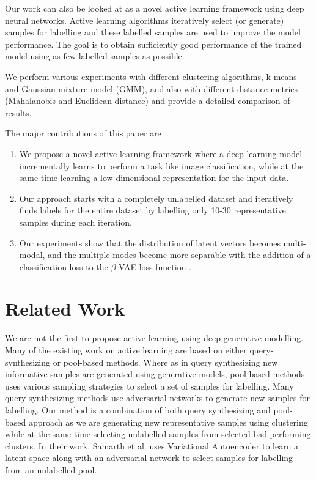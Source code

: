 \documentclass[runningheads]{llncs}
\begin{document}
Our work can also be looked at  as a novel  active learning framework using deep neural networks.
Active learning algorithms iteratively select (or generate) samples for labelling and these labelled samples are used to improve the model performance.
The goal is to obtain sufficiently good performance of the trained model using as few labelled samples as possible.

We perform various experiments with different clustering algorithms,  k-means and Gaussian mixture model (GMM), and also with different distance metrics (Mahalanobis and Euclidean distance) and provide a detailed comparison of results.

The major contributions of this paper are
\begin{enumerate}
    \item We propose a novel active learning framework where a  deep learning model incrementally learns to perform a task like image classification, while at the same time learning a low dimensional representation for the input data.
    \item Our approach starts with a completely unlabelled dataset and iteratively finds labels for the entire dataset by labelling only 10-30 representative samples during each iteration.
    \item Our experiments show that the distribution of latent vectors becomes multi-modal, and the multiple modes become more separable with the addition of a classification loss to the $\beta$-VAE loss function \cite{beta_vae}.
\end{enumerate}

\section{Related Work}
We are not the first to propose active learning using deep generative modelling.
Many of the existing work on active learning are based on either query-synthesizing or  pool-based methods.
Where as in query synthesizing new informative samples are generated using generative models, pool-based methods \cite{wang_2016,beluch_2018} uses various sampling strategies to select a set of samples for labelling.
Many query-synthesizing methods use adversarial networks \cite{mahapatra_2018,mayer_2020} to generate new samples for labelling.
Our method is a combination of both query synthesizing and pool-based approach as we are generating new representative samples using clustering while at the same time selecting unlabelled samples from selected bad performing clusters.
In their work, Samarth et al. \cite{vaal} uses Variational Autoencoder to learn a latent space along with an adversarial network to select samples for labelling from an unlabelled pool.
\end{document}
